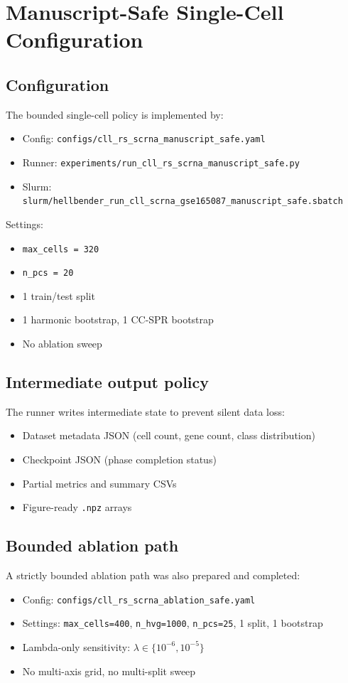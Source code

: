\documentclass[11pt]{article}
\begin{document}
\section{Manuscript-Safe Single-Cell Configuration}
\label{sec:scrna_config}

\subsection{Configuration}
The bounded single-cell policy is implemented by:
\begin{itemize}[leftmargin=1.5em]
\item Config: \texttt{configs/cll\_rs\_scrna\_manuscript\_safe.yaml}
\item Runner: \texttt{experiments/run\_cll\_rs\_scrna\_manuscript\_safe.py}
\item Slurm: \texttt{slurm/hellbender\_run\_cll\_scrna\_gse165087\_manuscript\_safe.sbatch}
\end{itemize}

Settings:
\begin{itemize}[leftmargin=1.5em]
\item \texttt{max\_cells = 320}
\item \texttt{n\_pcs = 20}
\item 1 train/test split
\item 1 harmonic bootstrap, 1 CC-SPR bootstrap
\item No ablation sweep
\end{itemize}

\subsection{Intermediate output policy}
The runner writes intermediate state to prevent silent data loss:
\begin{itemize}[leftmargin=1.5em]
\item Dataset metadata JSON (cell count, gene count, class distribution)
\item Checkpoint JSON (phase completion status)
\item Partial metrics and summary CSVs
\item Figure-ready \texttt{.npz} arrays
\end{itemize}

\subsection{Bounded ablation path}
A strictly bounded ablation path was also prepared and completed:
\begin{itemize}[leftmargin=1.5em]
\item Config: \texttt{configs/cll\_rs\_scrna\_ablation\_safe.yaml}
\item Settings: \texttt{max\_cells=400}, \texttt{n\_hvg=1000}, \texttt{n\_pcs=25}, 1 split, 1 bootstrap
\item Lambda-only sensitivity: $\lambda \in \{10^{-6}, 10^{-5}\}$
\item No multi-axis grid, no multi-split sweep
\end{itemize}
\end{document}
